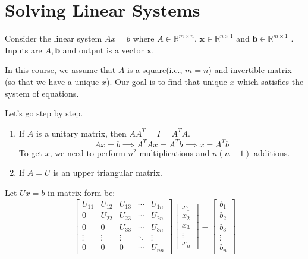\documentclass[
]{book}
\begin{document}
\hypertarget{solving-linear-systems}{%
\section{Solving Linear Systems}\label{solving-linear-systems}}

Consider the linear system \(Ax=b\) where \(A\in\mathbb{R}^{m\times n}\), \(\mathbf{x}\in\mathbb{R}^{n\times 1}\) and \(\mathbf{b}\in\mathbb{R}^{m\times 1}\) . Inputs are \(A, \mathbf{b}\) and output is a vector \(\mathbf{x}\).

In this course, we assume that \(A\) is a square(i.e., \(m=n\)) and invertible matrix (so that we have a unique \(x\)). Our goal is to find that unique \(x\) which satisfies the system of equations.

Let's go step by step.

\begin{enumerate}
\def\labelenumi{\arabic{enumi}.}
\item
  If \(A\) is a unitary matrix, then \(AA^T = I=A^TA\).
  \[Ax=b \implies A^T Ax = A^Tb \implies x = A^T b\]
  To get \(x\), we need to perform \(n^2\) multiplications and \(n(n-1)\) additions.
\item
  If \(A=U\) is an upper triangular matrix.
\end{enumerate}

Let \(Ux=b\) in matrix form be:
\begin{equation}
\begin{bmatrix}
U_{11} & U_{12} & U_{13} & \cdots & U_{1n}\\
0      & U_{22} & U_{23} & \cdots & U_{2n}\\
0      & 0      & U_{33} & \cdots & U_{3n}\\
\vdots & \vdots & \vdots & \ddots & \vdots\\
0      & 0      & 0      & \cdots & U_{nn}
\end{bmatrix}
\begin{bmatrix} x_1 \\ x_2 \\x_3\\ \vdots\\ x_n\end{bmatrix}
=
\begin{bmatrix} b_1 \\ b_2 \\b_3\\ \vdots\\ b_n\end{bmatrix}
\end{equation}
\end{document}
